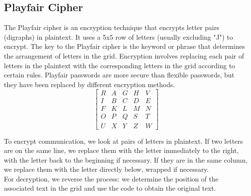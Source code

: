 \documentclass[11pt]{article}
\begin{document}
\subsection{Playfair Cipher}
The Playfair cipher is an encryption technique that encrypts letter pairs (digraphs) in plaintext. It uses a 5x5 row of letters (usually excluding "J") to encrypt. The key to the Playfair cipher is the keyword or phrase that determines the arrangement of letters in the grid. Encryption involves replacing each pair of letters in the plaintext with the corresponding letters in the grid according to certain rules. Playfair passwords are more secure than flexible passwords, but they have been replaced by different encryption methods.
\\
\[
\left[
\begin{array}{ccccc}
R & A & G&H&V \\
I&B&C&D&E\\
F&K&L&M&N\\
O&P&Q&S&T\\
U&X&Y&Z&W
\end{array}
\right]
\]

To encrypt communication, we look at pairs of letters in plaintext. If two letters are on the same line, we replace them with the letter immediately to the right, with the letter back to the beginning if necessary. If they are in the same column, we replace them with the letter directly below, wrapped if necessary.
\\
For decryption, we reverse the process: we determine the position of the associated text in the grid and use the code to obtain the original text.
\end{document}
